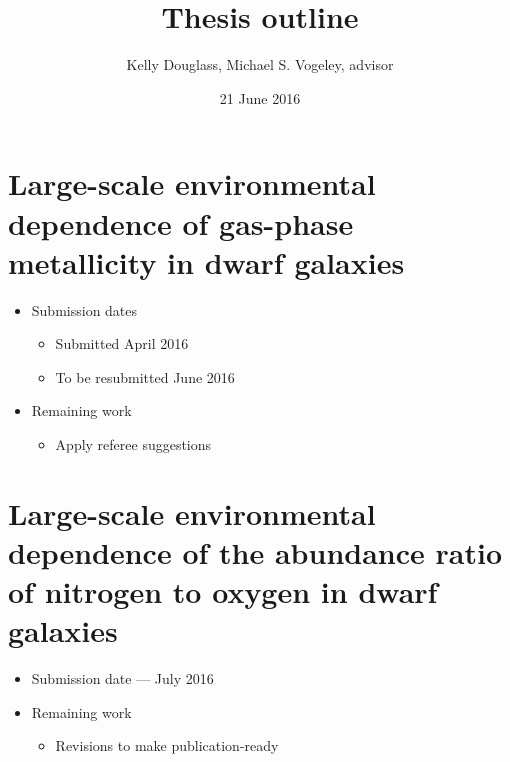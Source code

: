 \documentclass{article}
\begin{document}
\title{Thesis outline}
\author{Kelly Douglass, Michael S. Vogeley, advisor}
\date{21 June 2016}

\maketitle



\section{Large-scale environmental dependence of gas-phase metallicity in dwarf galaxies}
\begin{itemize}
    \item Submission dates
    \begin{itemize}
        \item Submitted April 2016
        \item To be resubmitted June 2016
    \end{itemize}
    \item Remaining work
    \begin{itemize}
        \item Apply referee suggestions
    \end{itemize}
\end{itemize}

\section{Large-scale environmental dependence of the abundance ratio of nitrogen to oxygen in dwarf galaxies}
\begin{itemize}
    \item Submission date --- July 2016
    \item Remaining work
    \begin{itemize}
        \item Revisions to make publication-ready
    \end{itemize}
\end{itemize}
\end{document}
